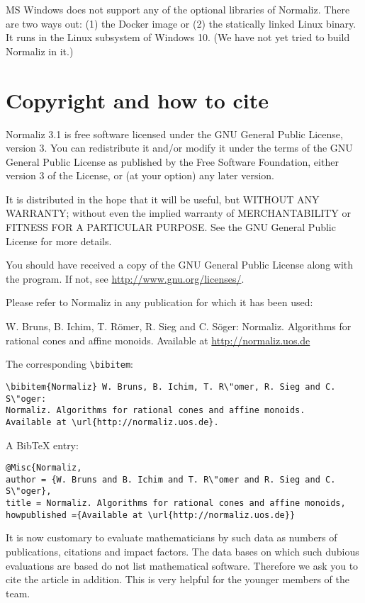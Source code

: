 \documentclass[12pt,a4paper]{scrartcl}
\theoremstyle{definition}
\begin{document}
MS Windows does not support any of the optional libraries of Normaliz. There are two ways out: (1) the Docker image or (2) the statically linked Linux binary. It runs in the Linux subsystem of Windows 10. (We have not yet tried to build Normaliz in it.)

\section{Copyright and how to cite}

Normaliz 3.1 is free software licensed under the GNU General
Public License, version 3. You can redistribute it and/or
modify it under the terms of the GNU General Public License as
published by the Free Software Foundation, either version 3 of
the License, or (at your option) any later version.

It is distributed in the hope that it will be useful, but
WITHOUT ANY WARRANTY; without even the implied warranty of
MERCHANTABILITY or FITNESS FOR A PARTICULAR PURPOSE. See the
GNU General Public License for more details.

You should have received a copy of the GNU General Public
License along with the program. If not, see
\url{http://www.gnu.org/licenses/}.

Please refer to Normaliz in any publication for which it has
been used:
\begin{center}
	W. Bruns, B. Ichim, T. R\"omer, R. Sieg and C. S\"oger: Normaliz. Algorithms for
	rational cones and affine monoids. Available at
	\url{http://normaliz.uos.de}
\end{center}
The corresponding \verb|\bibitem|:
\begin{Verbatim}
\bibitem{Normaliz} W. Bruns, B. Ichim, T. R\"omer, R. Sieg and C. S\"oger:
Normaliz. Algorithms for rational cones and affine monoids.
Available at \url{http://normaliz.uos.de}.
\end{Verbatim}

A BibTeX entry:
\begin{Verbatim}
@Misc{Normaliz,
author = {W. Bruns and B. Ichim and T. R\"omer and R. Sieg and C. S\"oger},
title = Normaliz. Algorithms for rational cones and affine monoids,
howpublished ={Available at \url{http://normaliz.uos.de}}
\end{Verbatim}

It is now customary to evaluate mathematicians by such data as
numbers of publications, citations and impact factors. The data
bases on which such dubious evaluations are based do not list
mathematical software. Therefore we ask you to cite the article
\cite{BIS} in addition. This is very helpful for the younger
members of the team.
\end{document}
